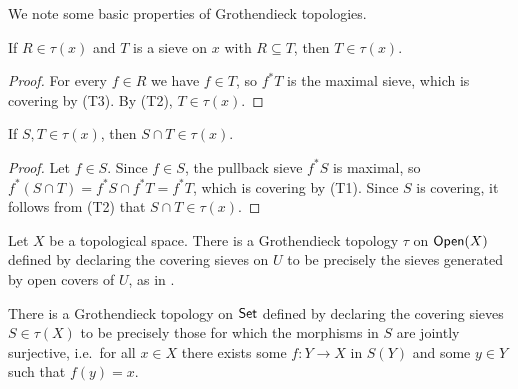 \startlecture[Sep 24, 2026]

We note some basic properties of Grothendieck topologies.

\begin{proposition}\label{prop:chap:sheaves:sec:sites:covering sieves closed upward}
    If $R \in \tau(x)$ and $T$ is a sieve on $x$ with $R \subseteq T$, then $T \in \tau(x)$.
\end{proposition}
\begin{proof}
    For every $f \in R$ we have $f \in T$, so $f^* T$ is the maximal sieve, which is covering by (T3). By (T2), $T \in \tau(x)$.
\end{proof}

\begin{proposition}\label{prop:chap:sheaves:sec:sites:covering sieves closed under intersection}
    If $S, T \in \tau(x)$, then $S \cap T \in \tau(x)$.
\end{proposition}
\begin{proof}
    Let $f \in S$. Since $f \in S$, the pullback sieve $f^* S$ is maximal, so $f^*(S \cap T) = f^* S \cap f^* T = f^* T$, which is covering by (T1). Since $S$ is covering, it follows from (T2) that $S \cap T \in \tau(x)$.
\end{proof}

\begin{example}\label{example:canonical topology on OpenX}
    Let $X$ be a topological space. There is a Grothendieck topology $\tau$ on $\mathsf{Open}(X)$ defined by declaring the covering sieves on $U$ to be precisely the sieves generated by open covers of $U$, as in .
\end{example}

\begin{example}\label{example:canonical topology on Set}
    There is a Grothendieck topology on $\mathsf{Set}$ defined by declaring the covering sieves $S \in \tau(X)$ to be precisely those for which the morphisms in $S$ are jointly surjective, i.e.\ for all $x \in X$ there exists some $f : Y \to X$ in $S(Y)$ and some $y \in Y$ such that $f(y) = x$.
\end{example}

